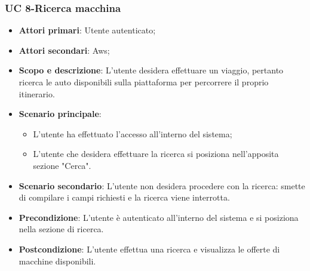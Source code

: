           
        
        
    \subsubsection{UC 8-Ricerca macchina}
       \begin{itemize}
        \item \textbf{Attori primari}: Utente autenticato;
        \item \textbf{Attori secondari}: Aws;
        \item \textbf{Scopo e descrizione}: L'utente desidera effettuare un viaggio, pertanto ricerca le auto disponibili sulla piattaforma per percorrere il proprio itinerario.
        \item \textbf{Scenario principale}:
            \begin{itemize}
                \item L'utente ha effettuato l'accesso all'interno del sistema;
                \item L'utente che desidera effettuare la ricerca si posiziona nell'apposita sezione "Cerca".
            \end{itemize}
        
        \item \textbf{Scenario secondario}: L'utente non desidera procedere con la ricerca: smette di compilare i campi richiesti e la ricerca viene interrotta.
       
        
       
        \item \textbf{Precondizione}: L'utente è autenticato all'interno del sistema e si posiziona nella sezione di ricerca.
        \item \textbf{Postcondizione}: L'utente effettua una ricerca e visualizza le offerte di macchine disponibili.
        \end{itemize}
            
